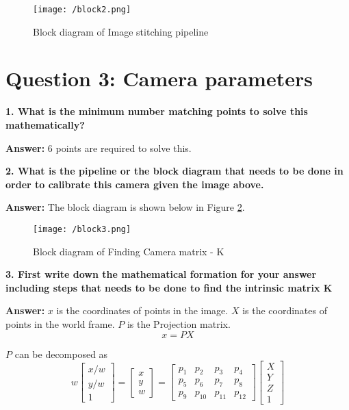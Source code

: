 \documentclass[a4paper, 10pt]{article}
\begin{document}
\begin{multicols}{2}
		\begin{figure}[H]
			\centering
			\texttt{[image: /block2.png]}
			\caption{Block diagram of Image stitching pipeline}
			\label{fig:block2}
		\end{figure}
		
		
		\section{Question 3: Camera parameters}
		
		\textbf{1. What is the minimum number matching points to solve this mathematically?}
		
		\textbf{Answer:}
			6 points are required to solve this.
			
		\textbf{2. What is the pipeline or the block diagram that needs to be done in order to calibrate this camera given the image above.}
		
		\textbf{Answer:}
		The block diagram is shown below in Figure \ref{fig:block3}.
		
		\begin{figure}[H]
			\centering
			\texttt{[image: /block3.png]}
			\caption{Block diagram of Finding Camera matrix - K}
			\label{fig:block3}
		\end{figure}
		
		
		\textbf{3. First write down the mathematical formation for your answer including steps that needs to be done to find the intrinsic matrix K}
		
		\textbf{Answer:}
		$x$ is the coordinates of points in the image.
		$X$ is the coordinates of points in the world frame.
		$P$ is the Projection matrix.
		\[x = PX\]
		
		$P$ can be decomposed as
		\[
		w\begin{bmatrix}
		x/w \\
		y/w \\
		1
		\end{bmatrix} =
		\begin{bmatrix}
		x \\
		y \\
		w
		\end{bmatrix} = 
		\begin{bmatrix}
		p_{1} & p_{2} & p_{3} & p_{4}\\
		p_{5} & p_{6} & p_{7} & p_{8}\\
		p_{9} & p_{10} & p_{11} & p_{12}
		\end{bmatrix}
		\begin{bmatrix}
		X \\
		Y \\
		Z \\
		1
		\end{bmatrix}
		\]
		

\end{multicols}
\end{document}
